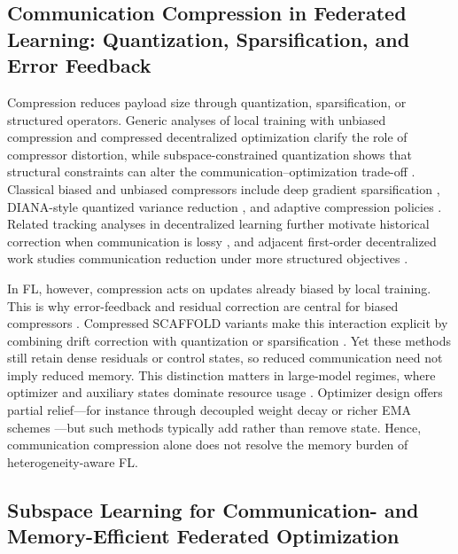 \documentclass[11pt]{article}
\begin{document}
\subsection{Communication Compression in Federated Learning: Quantization, Sparsification, and Error Feedback}

Compression reduces payload size through quantization, sparsification, or structured operators. Generic analyses of local training with unbiased compression \citep{Condat2024LoCoDLCD} and compressed decentralized optimization \citep{Koloskova2019DecentralizedSO} clarify the role of compressor distortion, while subspace-constrained quantization shows that structural constraints can alter the communication--optimization trade-off \citep{Nassif2022QuantizationFD}. Classical biased and unbiased compressors include deep gradient sparsification \citep{lin2017deep}, DIANA-style quantized variance reduction \citep{horvath2023stochastic}, and adaptive compression policies \citep{Tyagi2023GraVACAC}. Related tracking analyses in decentralized learning further motivate historical correction when communication is lossy \citep{koloskova2021improved}, and adjacent first-order decentralized work studies communication reduction under more structured objectives \citep{Wen2024ACA}.

In FL, however, compression acts on updates already biased by local training. This is why error-feedback and residual correction are central for biased compressors \citep{Richtarik2021EF21AN, Fatkhullin2023MomentumPI, Gruntkowska2025ErrorFF}. Compressed SCAFFOLD variants make this interaction explicit by combining drift correction with quantization or sparsification \citep{Huang2023StochasticCA}. Yet these methods still retain dense residuals or control states, so reduced communication need not imply reduced memory. This distinction matters in large-model regimes, where optimizer and auxiliary states dominate resource usage \citep{Rajbhandari2019ZeROMO, kaplan2020scaling}. Optimizer design offers partial relief---for instance through decoupled weight decay \citep{loshchilov2017decoupled} or richer EMA schemes \citep{Pagliardini2024TheAO}---but such methods typically add rather than remove state. Hence, communication compression alone does not resolve the memory burden of heterogeneity-aware FL.

\subsection{Subspace Learning for Communication- and Memory-Efficient Federated Optimization}
\end{document}
